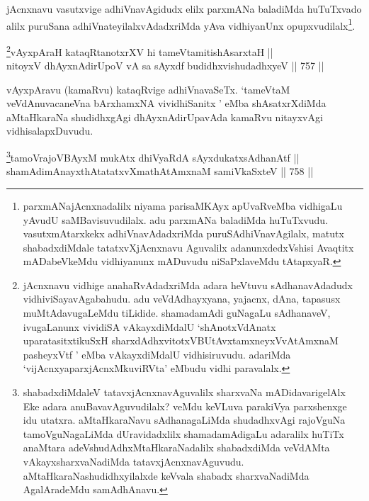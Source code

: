 \begin{artha} 
jAcnxnavu vasutxvige adhiVnavAgidudx elilx parxmANa baladiMda 
huTuTxvado alilx puruSana adhiVnateyilalxvAdadxriMda yAva vidhiyanUnx 
opupxvudilalx\footnote{parxmANajAcnxnadalilx niyama parisaMKAyx 
apUvaRveMba vidhigaLu yAvudU saMBavisuvudilalx. adu parxmANa baladiMda 
huTuTxvudu. vasutxmAtarxkekx adhiVnavAdadxriMda puruSAdhiVnavAgilalx, 
matutx shabadxdiMdale tatatxvXjAcnxnavu Aguvalilx adanunxdedxVshisi 
Avaqtitx mADabeVkeMdu vidhiyanunx mADuvudu niSaPxlaveMdu tAtapxyaR.}.
\end{artha}



\begin{shl}
\footnote{jAcnxnavu vidhige anahaRvAdadxriMda adara heVtuvu sAdhanavAdadudx vidhiviSayavAgabahudu. adu veVdAdhayxyana, yajacnx, dAna, tapasusx muMtAdavugaLeMdu tiLidide. shamadamAdi guNagaLu sAdhanaveV, ivugaLanunx vividiSA vAkayxdiMdalU `shAnotxVdAnatx uparatasitxtikuSxH sharxdAdhxvitotxV\break BUtAvx\s \s tamxneyxVvA\s \s tAmxnaM pasheyxVtf ' eMba vAkayxdiMdalU vidhisiruvudu. adariMda `vijAcnxya\-parxjAcnxMkuviRVta' eMbudu vidhi paravalalx.}vAyxpAraH kataqRtanotxrXV hi tameVtamitishAsarxtaH || \\
nitoyxV dhAyxnAdirUpoV vA sa sAyxdf budidhxvishudadhxyeV \hfill || 757 ||  
\end{shl}

\begin{artha} 
vAyxpAravu (kamaRvu) kataqRvige adhiVnavaSeTx. `tameVtaM veVdAnuvacaneVna bArxhamxNA vividhiSanitx ' eMba 
shAsatxrXdiMda aMtaHkaraNa shudidhxgAgi dhAyxnAdirUpavAda kamaRvu 
nitayxvAgi vidhisalapxDuvudu.
\end{artha}

\begin{shl}
\footnote{shabadxdiMdaleV tatavxjAcnxnavAguvalilx sharxvaNa mADidavarigelAlx Eke adara anuBavavAguvudilalx? veMdu keVLuva parakiVya parxshenxge idu utatxra. aMtaHkaraNavu sAdhanagaLiMda shudadhxvAgi rajoVguNa tamoVguNagaLiMda dUravidadxlilx shamadamAdigaLu adaralilx huTiTx anaMtara adeV\break shudAdhxMtaHkaraNadalilx shabadxdiMda veVdAMta vAkayxsharxvaNadiMda tatavxjAcnxnavAguvudu. aMtaHkaraNa\break shudidhxyilalxde keVvala shabadx sharxvaNadiMda AgalAradeMdu samAdhAnavu.}tamoVrajoVBAyxM mukAtx dhiVyaRdA sAyxdukatxsAdhanAtf || \\
shamAdimAnayxthAtatatxvXmathA\s \s tAmxnaM samiVkaSxteV \hfill || 758 ||  
\end{shl}

